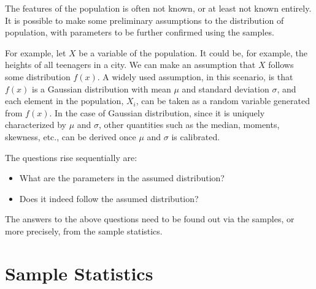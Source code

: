 The features of the population is often not known, or at least not known entirely. It is possible to make some preliminary assumptions to the distribution of population, with parameters to be further confirmed using the samples.

For example, let $X$ be a variable of the population. It could be, for example, the heights of all teenagers in a city. We can make an assumption that $X$ follows some distribution $f(x)$. A widely used assumption, in this scenario, is that $f(x)$ is a Gaussian distribution with mean $\mu$ and standard deviation $\sigma$, and each element in the population, $X_i$, can be taken as a random variable generated from $f(x)$. In the case of Gaussian distribution, since it is uniquely characterized by $\mu$ and $\sigma$, other quantities such as the median, moments, skewness, etc., can be derived once $\mu$ and $\sigma$ is calibrated.

The questions rise sequentially are:
\begin{itemize}
  \item What are the parameters in the assumed distribution?
  \item Does it indeed follow the assumed distribution?
\end{itemize}
The answers to the above questions need to be found out via the samples, or more precisely, from the sample statistics.

\section{Sample Statistics}






